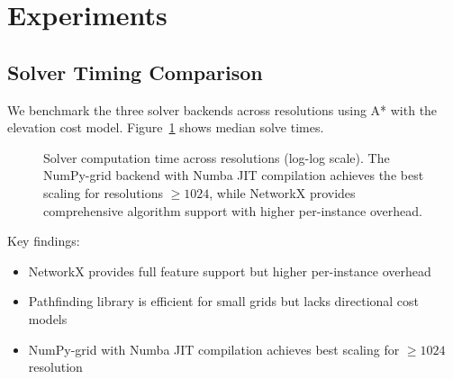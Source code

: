 \documentclass{article}
\begin{document}
\section{Experiments}
\label{sec:experiments}

\subsection{Solver Timing Comparison}

We benchmark the three solver backends across resolutions using A* with the elevation cost model. Figure~\ref{fig:solver_times} shows median solve times.

\begin{figure}[h]
\centering
\caption{Solver computation time across resolutions (log-log scale). The NumPy-grid backend with Numba JIT compilation achieves the best scaling for resolutions $\geq 1024$, while NetworkX provides comprehensive algorithm support with higher per-instance overhead.}
\label{fig:solver_times}
\end{figure}

Key findings:
\begin{itemize}[noitemsep]
    \item NetworkX provides full feature support but higher per-instance overhead
    \item Pathfinding library is efficient for small grids but lacks directional cost models
    \item NumPy-grid with Numba JIT compilation achieves best scaling for $\geq 1024$ resolution
\end{itemize}
\end{document}
